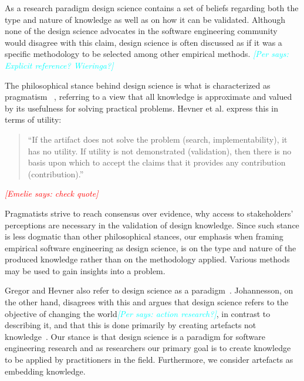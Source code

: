 \documentclass[graybox]{svmult}
\newcommand{\emelie}[1]{\textcolor{red}{{\it [Emelie says: #1]}}}
\newcommand{\per}[1]{\textcolor{cyan}{{\it [Per says: #1]}}}
\newcommand{\emelie}[1]{}
\newcommand{\per}[1]{}
\begin{document}
As a research paradigm design science contains a set of beliefs regarding both the type and nature of knowledge as well as on how it can be validated. Although none of the design science advocates in the software engineering community would disagree with this claim, design science is often discussed as if it was a specific methodology to be selected among other empirical methods. \per{Explicit reference? Wieringa?}

The philosophical stance behind design science is what is characterized as pragmatism~\cite{easterbrook_selecting_2008}%
, referring to a view that all knowledge is approximate and valued by its usefulness for solving practical problems. Hevner et al. express this in terms of utility: 

\begin{quote}
	``If the artifact does not solve the problem (search, implementability), it has no utility. If utility is not demonstrated (validation), then there is no basis upon which to accept the claims that it provides any contribution (contribution).''~\cite{hevner_design_2004}
\end{quote}\emelie{check quote} 

Pragmatists strive to reach consensus over evidence, why access to stakeholders' perceptions are necessary in the validation of design knowledge. Since such stance is less dogmatic than other philosophical stances, our emphasis when framing empirical software engineering as design science, is on the type and nature of the produced knowledge rather than on the methodology applied. Various methods may be used to gain insights into a problem.

Gregor and Hevner also refer to design science as a paradigm~\cite{gregor_positioning_2013}. Johannesson, on the other hand, disagrees with this and argues that design science refers to the objective of changing the world\per{action research?}, in contrast to describing it, and that this is done primarily by creating artefacts not knowledge~\cite{johannesson_introduction_2014}. Our stance is that design science is a paradigm for software engineering research and as researchers our primary goal is to create knowledge to be applied by practitioners in the field. Furthermore, we consider artefacts as embedding knowledge. 


\end{document}
